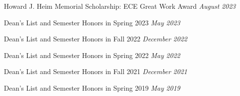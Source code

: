 \begin{zitemize}
\item Howard J. Heim Memorial Scholarship: ECE Great Work Award \hfill \emph{August 2023}
\item Dean's List and Semester Honors in Spring 2023 \hfill \emph{May 2023}
\item Dean's List and Semester Honors in Fall 2022 \hfill \emph{December 2022}
\item Dean's List and Semester Honors in Spring 2022 \hfill \emph{May 2022}
\item Dean's List and Semester Honors in Fall 2021 \hfill \emph{December 2021}
\item Dean's List and Semester Honors in Spring 2019 \hfill \emph{May 2019}
\end{zitemize}

